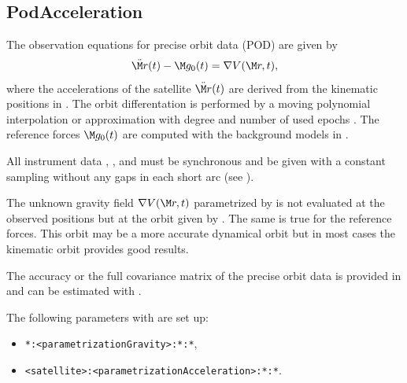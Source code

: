 \subsection{PodAcceleration}\label{observationType:podAcceleration}
The observation equations for precise orbit data (POD) are given by
\begin{equation}
\ddot{\M r}(t) - \M g_0(t) = \nabla V(\M r, t),
\end{equation}
where the accelerations of the satellite $\ddot{\M r}(t)$ are derived from the kinematic positions
in . The orbit differentation is performed by a moving
polynomial interpolation or approximation with degree 
and number of used epochs . The reference forces $\M g_0(t)$ are computed
with the background models in .

All instrument data , ,
and  must be synchronous and be given
with a constant sampling without any gaps in each short arc (see ).

The unknown gravity field $\nabla V(\M r, t)$ parametrized by 
is not evaluated at the observed positions but at the orbit given by .
The same is true for the reference forces. This orbit may be a more accurate dynamical orbit but
in most cases the kinematic orbit provides good results.

The accuracy or the full covariance matrix of the precise orbit data is provided in
 and can be estimated with .

The following parameters with  are set up:
\begin{itemize}
\item \verb|*:<parametrizationGravity>:*:*|,
\item \verb|<satellite>:<parametrizationAcceleration>:*:*|.
\end{itemize}


